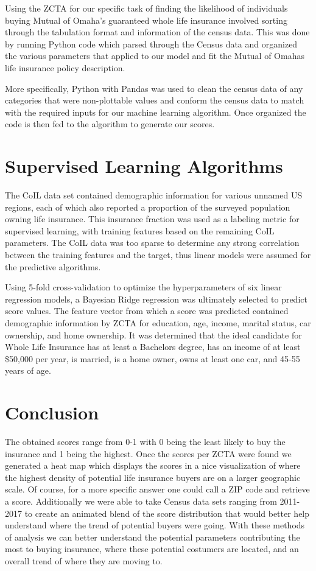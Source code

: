 \documentclass[12pt]{article}
\begin{document}
Using the ZCTA for our specific task of finding the likelihood of individuals buying Mutual of Omaha's guaranteed whole life insurance involved sorting through the tabulation format and information of the census data. 
This was done by running Python code which parsed through the Census data and organized the various parameters that applied to our model and fit the Mutual of Omahas life insurance policy description.

More specifically, Python with Pandas was used to clean the census data of any categories that were non-plottable values and conform the census data to match with the required inputs for our machine learning algorithm.
Once organized the code is then fed to the algorithm to generate our scores.

\section{Supervised Learning Algorithms}
The CoIL data set contained demographic information for various unnamed US regions, each of which also reported a proportion of the surveyed population owning life insurance. 
This insurance fraction was used as a labeling metric for supervised learning, with training features based on the remaining CoIL parameters. 
The CoIL data was too sparse to determine any strong correlation between the training features and the target, thus linear models were assumed for the predictive algorithms.

Using 5-fold cross-validation to optimize the hyperparameters of six linear regression models, a Bayesian Ridge regression was ultimately selected to predict score values. 
The feature vector from which a score was predicted contained demographic information by ZCTA for education, age, income, marital status, car ownership, and home ownership. 
It was determined that the ideal candidate for Whole Life Insurance has at least a Bachelors degree, has an income of at least \$50,000 per year, is married, is a home owner, owns at least one car, and 45-55 years of age.


\section{Conclusion}
The obtained scores range from 0-1 with 0 being the least likely to buy the insurance and 1 being the highest.
Once the scores per ZCTA were found we generated a heat map which displays the scores in a nice visualization of where the highest density of potential life insurance buyers are on a larger geographic scale. 
Of course, for a more specific answer one could call a ZIP code and retrieve a score.
Additionally we were able to take Census data sets ranging from 2011-2017 to create an animated blend of the score distribution that would better help understand where the trend of potential buyers were going. 
With these methods of analysis we can better understand the potential parameters contributing the most to buying insurance, where these potential costumers are located, and an overall trend of where they are moving to.
\end{document}
